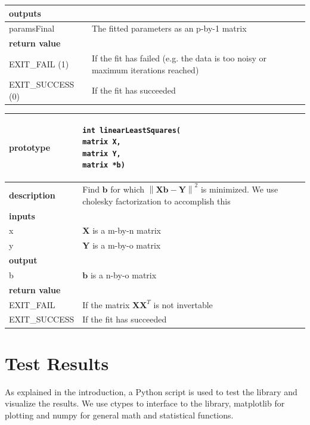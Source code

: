 \documentclass{article}
\newcommand\norm[1]{\left\lVert#1\right\rVert}
\begin{document}
\begin{center}
\begin{longtable}{|l|p{}|}
  \hline
  \multicolumn{2}{l}{\textbf{outputs}} \\
  \hline
  paramsFinal & The fitted parameters as an p-by-1 matrix \\
  \hline
  \multicolumn{2}{l}{\textbf{return value}} \\
  \hline
  EXIT\_FAIL (1) & If the fit has failed (e.g. the data is too noisy or maximum iterations reached) \\
  \hline
  EXIT\_SUCCESS (0) & If the fit has succeeded \\
  \hline
\end{longtable}
\end{center}

\begin{center}
\begin{longtable}{|l|p{}|}
  \hline
  \textbf{prototype} & \begin{lstlisting} 
int linearLeastSquares(
matrix X, 
matrix Y, 
matrix *b)
\end{lstlisting} \\
\hline
\textbf{description} & Find $\mathbf{b}$ for which $\norm{\mathbf{Xb}-\mathbf{Y}}^2$ is minimized. We use cholesky factorization to accomplish this\\
\hline
\multicolumn{2}{l}{\textbf{inputs}} \\
 \hline
x & $\mathbf{X}$ is a m-by-n matrix \\
\hline
y & $\mathbf{Y}$ is a m-by-o matrix \\
\hline
\multicolumn{2}{l}{\textbf{output}} \\
\hline
b & $\mathbf{b}$ is a n-by-o matrix \\
\hline
\multicolumn{2}{l}{\textbf{return value}} \\
\hline
EXIT\_FAIL & If the matrix $\mathbf{X}\mathbf{X}^T$ is not invertable \\
\hline
EXIT\_SUCCESS & If the fit has succeeded \\
\hline
\end{longtable} 
\end{center}

\section{Test Results}

As explained in the introduction, a Python script is used to test the library and visualize the results. We use ctypes to interface to the library, matplotlib for plotting and numpy for general math and statistical functions. 
\end{document}
